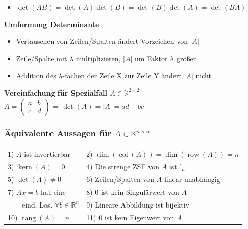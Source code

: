 \documentclass[8pt,a4paper]{scrartcl}
\DeclareMathOperator{\Kern}{kern}
\DeclareMathOperator{\rang}{rang}
\DeclareMathOperator{\col}{col}
\DeclareMathOperator{\row}{row}
\begin{document}
\begin{multicols*}{3}
\begin{itemize}
					\item $\det(AB) = \det(A) \det(B) = \det(B) \det(A) = \det(BA)$
				\end{itemize}
				\textbf{Umformung Determinante}
				\begin{itemize}\itemsep0pt
					\item Vertauschen von Zeilen/Spalten ändert Vorzeichen von $|A|$
					\item Zeile/Spalte mit $\lambda$ multiplizieren, $|A|$ um Faktor $\lambda$ größer
					\item Addition des $\lambda$-fachen der Zeile X zur Zeile Y ändert $|A|$ nicht 
				\end{itemize}
				\textbf{Vereinfachung für Spezialfall $A\in \mathbb K^{2\times 2}$}\\
				$A=\begin{pmatrix}a&b\\c&d\end{pmatrix} \Rightarrow \det(A)=|A|=ad-bc$

			\subsubsection{Äquivalente Aussagen für $A\in \mathbb K^{n\times n}$}
				\begin{tabular}{ll}
					1)  $A$ ist invertierbar & 2) $\dim(\col(A))=\dim(\row(A))=n$\\
					3)  $\Kern(A)={0}$ & 4) Die strenge ZSF von $A$ ist $\mathbb{I}_n$\\
					5) $\det(A)\ne0$ & 6) Zeilen/Spalten von $A$ linear unabhängig\\
					7) $Ax=b$ hat eine & 8) 0 ist kein Singulärwert von $A$\\\ \ \ \ eind. Lös. $\forall b\in\mathbb{R}^n$ & 9) Lineare Abbildung ist bijektiv\\
					10)  $\rang(A)=n$ & 11) 0 ist kein Eigenwert von $A$\\

				\end{tabular}			
			
			

    


\end{multicols*}

\end{document}
